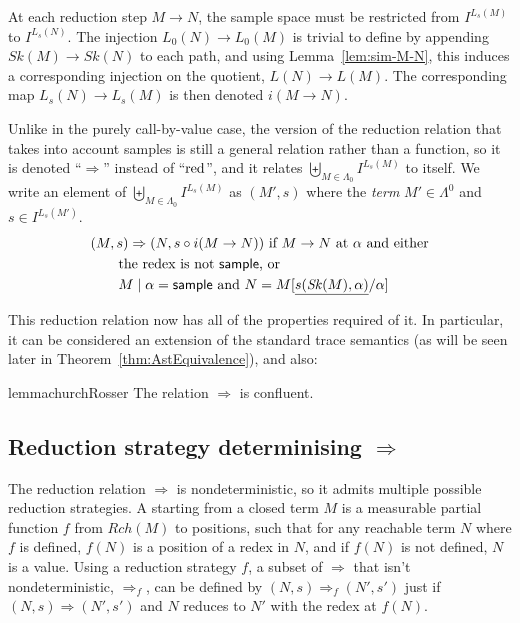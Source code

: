 At each reduction step $M \to N$, the sample space must be restricted from $I^{L_s(M)}$ to $I^{L_s(N)}$. 
The injection $L_0(N) \to L_0(M)$ is trivial to define by appending $\mathit{Sk}(M) \to \mathit{Sk}(N)$ to each path, and using Lemma~\ref{lem:sim-M-N}, this induces a corresponding injection on the quotient, $L(N) \to L(M)$. 
The corresponding map $L_s(N) \to L_s(M)$ is then denoted $i(M \to N)$.

\begin{definition}\rm
Unlike in the purely call-by-value case, the version of the reduction relation that takes into account samples is still a general relation rather than a function, so it is denoted ``$\Rightarrow$'' instead of ``$\operatorname{red}$'', and it relates $\biguplus_{M \in \Lambda_0} I^{L_s(M)}$ to itself.
We write an element of $\biguplus_{M \in \Lambda_0} I^{L_s(M)}$ as $(M', s)$ where the \emph{term} $M' \in \Lambda^0$ and $s \in  I^{L_s(M')}$.
\begin{align*}
& (M,s) \Rightarrow (N,s \circ i(M \to N)) \text{ if $M \to N$ at $\alpha$ and either} \\
& \qquad \text{the redex is not $\mathsf{sample}$, or} \\
& \qquad \text{$M \mid \alpha = \mathsf{sample}$ and $N = M[\underline{s(\mathit{Sk}(M),\alpha)}/\alpha]$}
\end{align*}
\end{definition}

\medskip
This reduction relation now has all of the properties required of it. In particular, it can be considered an extension of the standard trace semantics (as will be seen later in Theorem~\ref{thm:AstEquivalence}), and also:
\begin{restatable}{lemma}{churchRosser} \label{churchRosser}
The relation $\Rightarrow$ is confluent.
\end{restatable}

\subsection{Reduction strategy determinising $\Rightarrow$}
The reduction relation $\Rightarrow$ is nondeterministic, so it admits multiple possible reduction strategies. 
A  starting from a closed term $M$ is a measurable partial function $f$ from $\mathit{Rch}(M)$ to positions, such that for any reachable term $N$ where $f$ is defined, $f(N)$ is a position of a redex in $N$, and if $f(N)$ is not defined, $N$ is a value.
Using a reduction strategy $f$, a subset of $\Rightarrow$ that isn't nondeterministic, $\Rightarrow_f$, can be defined by $(N,s) \Rightarrow_f (N',s')$ just if $(N,s) \Rightarrow (N',s')$ and $N$ reduces to $N'$ with the redex at $f(N)$.

